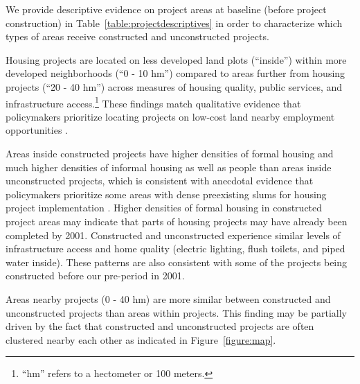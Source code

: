\documentclass[12pt]{article}
\newcommand{\hmref}{
	``hm'' refers to a hectometer or 100 meters.
}
\begin{document}
 

We provide descriptive evidence on project areas at baseline (before project construction) in Table~\ref{table:projectdescriptives} in order to characterize which types of areas receive constructed and unconstructed projects.

Housing projects are located on less developed land plots (``inside'') within more developed neighborhoods (``0 - 10 hm'') compared to areas further from housing projects (``20 - 40 hm'') across measures of housing quality, public services, and infrastructure access.\footnote{\hmref}  These findings match qualitative evidence that policymakers prioritize locating projects on low-cost land nearby employment opportunities \citep{beninterview}.

Areas inside constructed projects have higher densities of formal housing and much higher densities of informal housing as well as people than areas inside unconstructed projects, which is consistent with anecdotal evidence that policymakers prioritize some areas with dense preexisting slums for housing project implementation \citep{hofmeyr2008risk}.  Higher densities of formal housing in constructed project areas may indicate that parts of housing projects may have already been completed by 2001.  Constructed and unconstructed experience similar levels of infrastructure access and home quality (electric lighting, flush toilets, and piped water inside).  These patterns are also consistent with some of the projects being constructed before our pre-period in 2001.

Areas nearby projects (0 - 40 hm) are more similar between constructed and unconstructed projects than areas within projects.  This finding may be partially driven by the fact that constructed and unconstructed projects are often clustered nearby each other as indicated in Figure~\ref{figure:map}.



\end{document}

